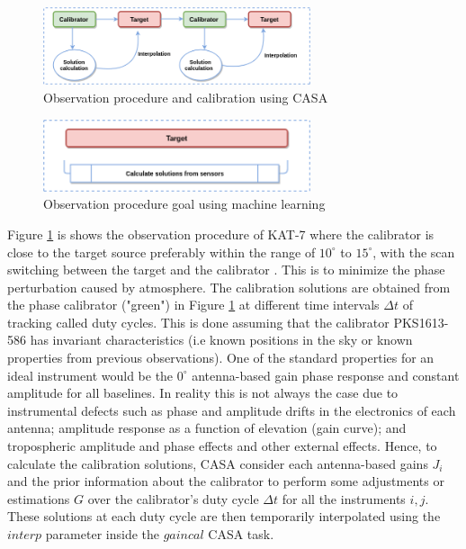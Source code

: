 \begin{figure}[H]
  \centering
    \includegraphics[width=0.7\textwidth]{images/cal4.png}
    \caption{Observation procedure and calibration using CASA}
  \label{Cal2}
\end{figure}

\begin{figure}[H]
  \centering
    \includegraphics[width=0.7\textwidth]{images/Cal3.png}
    \caption{Observation procedure goal using machine learning}
  \label{Cal3}
\end{figure}

Figure \ref{Cal2} is shows the observation procedure of KAT-7 where the calibrator is close to the target source preferably within the range of $10^{\circ}$ to $15^{\circ}$, with the scan switching  between  the target and the calibrator \citep{kassaye2015study}. This is to minimize the phase perturbation caused by atmosphere. The calibration solutions are obtained from the phase calibrator ("green") in Figure \ref{Cal2} at different time intervals $\Delta t$ of tracking called duty cycles. This is done assuming that the calibrator PKS1613-586 has invariant characteristics (i.e known positions in the sky or known properties from previous observations). One of the standard properties for an ideal instrument would be the $0^{\circ}$ antenna-based gain phase response and constant amplitude for all baselines. In reality this is not always the case due to instrumental defects such as phase and amplitude drifts in the electronics of each antenna; amplitude response as a function of elevation (gain curve); and tropospheric amplitude and phase effects and other external effects. Hence, to calculate the calibration solutions, CASA consider each antenna-based gains $J_i$ and the prior information about the calibrator to perform some adjustments or estimations $G$ over the calibrator's duty cycle $\Delta t$ for all the instruments $i,j$. These solutions at each duty cycle are then temporarily interpolated using the $\textit{interp}$ parameter inside the $\textit{gaincal}$ CASA task. 

